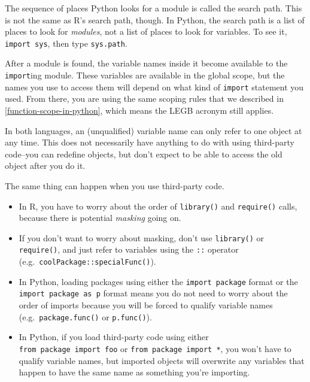 \documentclass[
  12pt,
  krantz2]{krantz}
\providecommand{\tightlist}{%
  \setlength{\itemsep}{0pt}\setlength{\parskip}{0pt}}
\begin{document}
The sequence of places Python looks for a module is called the search path. This is not the same as R's search path, though. In Python, the search path is a list of places to look for \emph{modules}, not a list of places to look for variables. To see it, \texttt{import\ sys}, then type \texttt{sys.path}.

After a module is found, the variable names inside it become available to the \texttt{import}ing module. These variables are available in the global scope, but the names you use to access them will depend on what kind of \texttt{import} statement you used. From there, you are using the same scoping rules that we described in \ref{function-scope-in-python}, which means the LEGB acronym still applies.

\begin{rmd-details}

In both languages, an (unqualified) variable name can only refer to one object at any time. This does not necessarily have anything to do with using third-party code--you can redefine objects, but don't expect to be able to access the old object after you do it.

The same thing can happen when you use third-party code.

\begin{itemize}
\tightlist
\item
  In R, you have to worry about the order of \texttt{library()} and \texttt{require()} calls, because there is potential \emph{masking} going on.
\item
  If you don't want to worry about masking, don't use \texttt{library()} or \texttt{require()}, and just refer to variables using the \texttt{::} operator (e.g.~\texttt{coolPackage::specialFunc()}).
\item
  In Python, loading packages using either the \texttt{import\ package} format or the \texttt{import\ package\ as\ p} format means you do not need to worry about the order of imports because you will be forced to qualify variable names (e.g.~\texttt{package.func()} or \texttt{p.func()}).
\item
  In Python, if you load third-party code using either \texttt{from\ package\ import\ foo} or \texttt{from\ package\ import\ *}, you won't have to qualify variable names, but imported objects will overwrite any variables that happen to have the same name as something you're importing.
\end{itemize}


\end{rmd-details}
\end{document}
